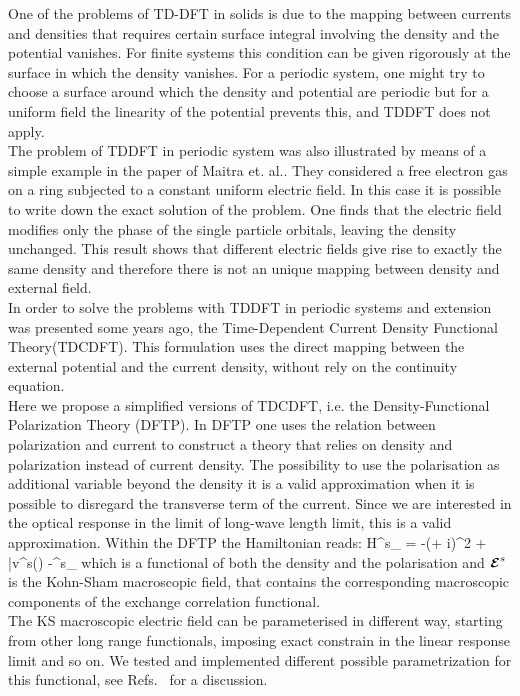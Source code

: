 One of the problems of TD-DFT in solids is due to the mapping between currents and densities that requires certain surface integral involving the density and the potential vanishes. For finite systems this condition  can be given rigorously at the surface in which the density vanishes. For a periodic system, one might try to choose a surface around which the density and potential are periodic but for a uniform field the linearity of the potential prevents this, and TDDFT does not apply. \\
The problem of TDDFT in periodic system was also illustrated  by means of a simple example in the paper of Maitra et. al.\cite{maitra2003current}. They considered a free electron gas on a ring subjected to a constant uniform electric field. In this case it is possible to write down the exact solution of the problem. One finds that the electric field modifies only the phase of the single particle orbitals, leaving the density unchanged. This result shows that different electric fields  give rise to exactly the same density and therefore there is not an unique mapping between density and external field.\\
In order to solve the problems with TDDFT in periodic systems and extension was presented some years ago, the Time-Dependent Current Density Functional Theory(TDCDFT)\cite{PhysRevA.38.1149}. This formulation uses the direct mapping between the external potential and the current density, without rely on the continuity equation.\\
Here we propose a simplified versions of TDCDFT, i.e. the Density-Functional Polarization Theory (DFTP).  In DFTP one uses the relation between polarization and current to construct a theory that relies on density and polarization instead of current density. The possibility to use the polarisation as additional variable beyond the density it is a valid approximation when it is possible to disregard the transverse term of the current. Since we are interested in the optical response in the limit of long-wave length limit, this is a valid approximation. Within the DFTP the Hamiltonian reads:
\be \label{eq:dpftks}
H^{s}_\kk
= -\left(\nabla + i\kk\right )^2 + \bar v^{s}(\rr) -\Omega\Efield^{s}\cdot \nabla_\kk %
\ee
which is a functional of both the density and the polarisation and $\boldsymbol{\cal E}^{s}$ is the Kohn-Sham macroscopic field, that contains the corresponding macroscopic components of the exchange correlation functional.\\ 
The KS macroscopic electric field can be parameterised in different way, starting from other long range functionals, imposing exact constrain in the linear response limit and so on. We tested and implemented different possible parametrization for this functional, see Refs.~ for a discussion.
